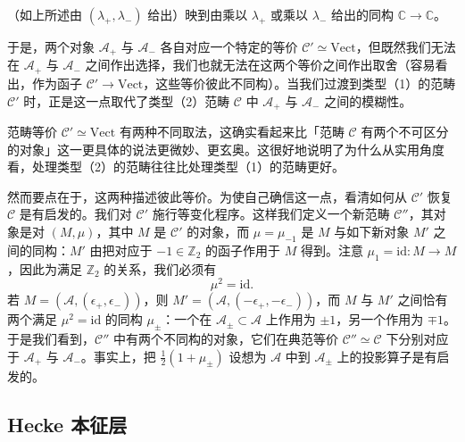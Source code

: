 （如上所述由 $(\lambda_+,\lambda_-)$ 给出）映到由乘以 $\lambda_+$ 或乘以 $\lambda_-$ 给出的同构 $\mathbb{C}\to\mathbb{C}$。

于是，两个对象 $\mathcal{A}_+$ 与 $\mathcal{A}_-$ 各自对应一个特定的等价 $\mathcal{C}'\simeq\mathrm{Vect}$，但既然我们无法在 $\mathcal{A}_+$ 与 $\mathcal{A}_-$ 之间作出选择，我们也就无法在这两个等价之间作出取舍（容易看出，作为函子 $\mathcal{C}'\to\mathrm{Vect}$，这些等价彼此不同构）。当我们过渡到类型（1）的范畴 $\mathcal{C}'$ 时，正是这一点取代了类型（2）范畴 $\mathcal{C}$ 中 $\mathcal{A}_+$ 与 $\mathcal{A}_-$ 之间的模糊性。

范畴等价 $\mathcal{C}'\simeq\mathrm{Vect}$ 有两种不同取法，这确实看起来比「范畴 $\mathcal{C}$ 有两个不可区分的对象」这一更具体的说法更微妙、更玄奥。这很好地说明了为什么从实用角度看，处理类型（2）的范畴往往比处理类型（1）的范畴更好。

然而要点在于，这两种描述彼此等价。为使自己确信这一点，看清如何从 $\mathcal{C}'$ 恢复 $\mathcal{C}$ 是有启发的。我们对 $\mathcal{C}'$ 施行等变化程序。这样我们定义一个新范畴 $\mathcal{C}''$，其对象是对 $(M,\mu)$，其中 $M$ 是 $\mathcal{C}'$ 的对象，而 $\mu = \mu_{-1}$ 是 $M$ 与如下新对象 $M'$ 之间的同构：$M'$ 由把对应于 $-1\in\mathbb{Z}_2$ 的函子作用于 $M$ 得到。注意 $\mu_1 = \mathrm{id} : M\to M$，因此为满足 $\mathbb{Z}_2$ 的关系，我们必须有
\[
\mu^2 = \mathrm{id}.
\]
若 $M = (\mathcal{A},(\epsilon_+,\epsilon_-))$，则 $M' = (\mathcal{A},(-\epsilon_+,-\epsilon_-))$，而 $M$ 与 $M'$ 之间恰有两个满足 $\mu^2 = \mathrm{id}$ 的同构 $\mu_\pm$：一个在 $\mathcal{A}_\pm\subset\mathcal{A}$ 上作用为 $\pm1$，另一个作用为 $\mp1$。于是我们看到，$\mathcal{C}''$ 中有两个不同构的对象，它们在典范等价 $\mathcal{C}''\simeq\mathcal{C}$ 下分别对应于 $\mathcal{A}_+$ 与 $\mathcal{A}_-$。事实上，把 $\frac{1}{2}(1+\mu_\pm)$ 设想为 $\mathcal{A}$ 中到 $\mathcal{A}_\pm$ 上的投影算子是有启发的。


\subsection{Hecke 本征层}

